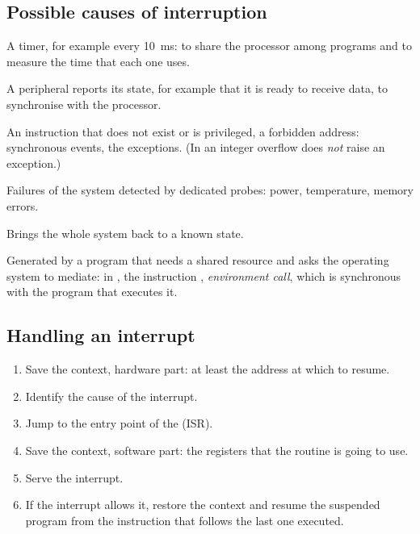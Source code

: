 \subsection{Possible causes of interruption}

\begin{description}[style=nextline,leftmargin=1.5em]
\item[Periodic interrupt.] A timer, for example every 10~ms: to share the
  processor among programs and to measure the time that each one uses.
\item[I/O interrupt.] A peripheral reports its state, for example that it is
  ready to receive data, to synchronise with the processor.
\item[Errors in the program.] An instruction that does not exist or is
  privileged, a forbidden address: synchronous events, the exceptions. (In
  \riscv an integer overflow does \emph{not} raise an exception.)
\item[Faults.] Failures of the system detected by dedicated probes: power,
  temperature, memory errors.
\item[Reset.] Brings the whole system back to a known state.
\item[Software interrupt.] Generated by a program that needs a shared resource
  and asks the operating system to mediate: in \riscv, the instruction
  , \emph{environment call}, which is synchronous with the program
  that executes it.
\end{description}

\subsection{Handling an interrupt}

\begin{enumerate}
\item Save the context, hardware part: at least the address at which to resume.
\item Identify the cause of the interrupt.
\item Jump to the entry point of the  (ISR).
\item Save the context, software part: the registers that the routine is going
  to use.
\item Serve the interrupt.
\item If the interrupt allows it, restore the context and resume the suspended
  program from the instruction that follows the last one executed.
\end{enumerate}

